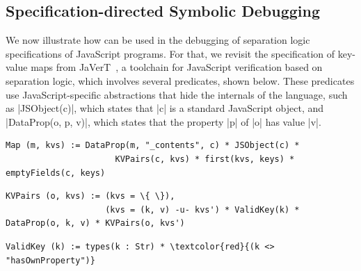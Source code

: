 \subsection{Specification-directed Symbolic Debugging}

%

We now illustrate how \jilette can be used in the debugging of separation logic specifications of JavaScript programs. For that, we revisit the specification of key-value maps from JaVerT~\cite{javert}, a toolchain for JavaScript verification based on separation logic, which involves several predicates, shown below. These predicates use JavaScript-specific abstractions that hide the internals of the language, such as \jsinline|JSObject(c)|, which states that \jsinline|c| is a standard JavaScript object, and \jsinline|DataProp(o, p, v)|, which states that the property \jsinline|p| of \jsinline|o| has value \jsinline|v|.


\begin{Verbatim}[fontsize=\footnotesize,commandchars=\\\{\}]
    Map (m, kvs) := DataProp(m, "_contents", c) * JSObject(c) * 
                      KVPairs(c, kvs) * first(kvs, keys) * emptyFields(c, keys)
\end{Verbatim}
 \begin{Verbatim}[fontsize=\footnotesize,commandchars=\\\{\}]
KVPairs (o, kvs) := (kvs = \{ \}),
                    (kvs = (k, v) -u- kvs') * ValidKey(k) * DataProp(o, k, v) * KVPairs(o, kvs')
\end{Verbatim}
\begin{Verbatim}[fontsize=\footnotesize,commandchars=\\\{\}]
    ValidKey (k) := types(k : Str) * \textcolor{red}{(k <> "hasOwnProperty")}
\end{Verbatim}



